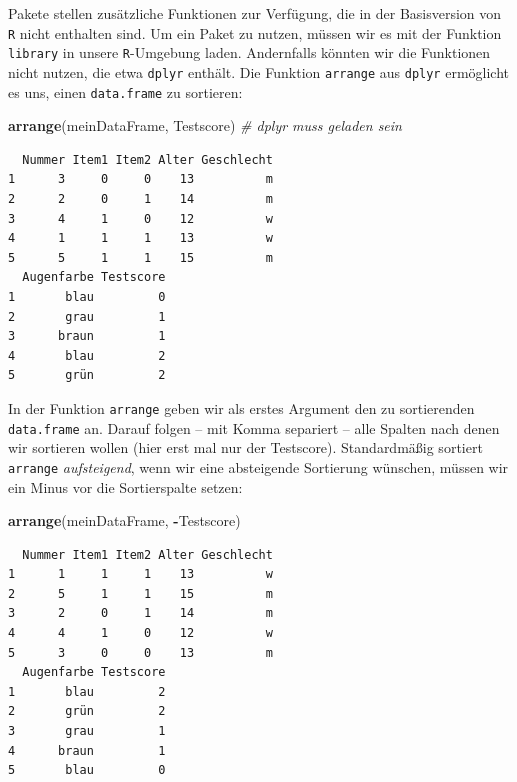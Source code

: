 \documentclass[12pt,]{tufte-book}
\newenvironment{Shaded}{\begin{snugshade}}{\end{snugshade}}
\newcommand{\KeywordTok}[1]{\textcolor[rgb]{0.13,0.29,0.53}{\textbf{#1}}}
\newcommand{\CommentTok}[1]{\textcolor[rgb]{0.56,0.35,0.01}{\textit{#1}}}
\newcommand{\OperatorTok}[1]{\textcolor[rgb]{0.81,0.36,0.00}{\textbf{#1}}}
\newcommand{\NormalTok}[1]{#1}
\theoremstyle{definition}
\theoremstyle{definition}
\theoremstyle{definition}
\theoremstyle{remark}
\begin{document}
Pakete stellen zusätzliche Funktionen zur Verfügung, die in der
Basisversion von \texttt{R} nicht enthalten sind. Um ein Paket zu
nutzen, müssen wir es mit der Funktion \texttt{library} in unsere
\texttt{R}-Umgebung laden. Andernfalls könnten wir die Funktionen nicht
nutzen, die etwa \texttt{dplyr} enthält. Die Funktion \texttt{arrange}
aus \texttt{dplyr} ermöglicht es uns, einen \texttt{data.frame} zu
sortieren:

\begin{Shaded}
\begin{Highlighting}[]
\KeywordTok{arrange}\NormalTok{(meinDataFrame, Testscore)  }\CommentTok{# dplyr muss geladen sein}
\end{Highlighting}
\end{Shaded}

\begin{verbatim}
  Nummer Item1 Item2 Alter Geschlecht
1      3     0     0    13          m
2      2     0     1    14          m
3      4     1     0    12          w
4      1     1     1    13          w
5      5     1     1    15          m
  Augenfarbe Testscore
1       blau         0
2       grau         1
3      braun         1
4       blau         2
5       grün         2
\end{verbatim}

In der Funktion \texttt{arrange} geben wir als erstes Argument den zu
sortierenden \texttt{data.frame} an. Darauf folgen -- mit Komma
separiert -- alle Spalten nach denen wir sortieren wollen (hier erst mal
nur der Testscore). Standardmäßig sortiert \texttt{arrange}
\emph{aufsteigend}, wenn wir eine absteigende Sortierung wünschen,
müssen wir ein Minus vor die Sortierspalte setzen:

\begin{Shaded}
\begin{Highlighting}[]
\KeywordTok{arrange}\NormalTok{(meinDataFrame, }\OperatorTok{-}\NormalTok{Testscore)}
\end{Highlighting}
\end{Shaded}

\begin{verbatim}
  Nummer Item1 Item2 Alter Geschlecht
1      1     1     1    13          w
2      5     1     1    15          m
3      2     0     1    14          m
4      4     1     0    12          w
5      3     0     0    13          m
  Augenfarbe Testscore
1       blau         2
2       grün         2
3       grau         1
4      braun         1
5       blau         0
\end{verbatim}
\end{document}
